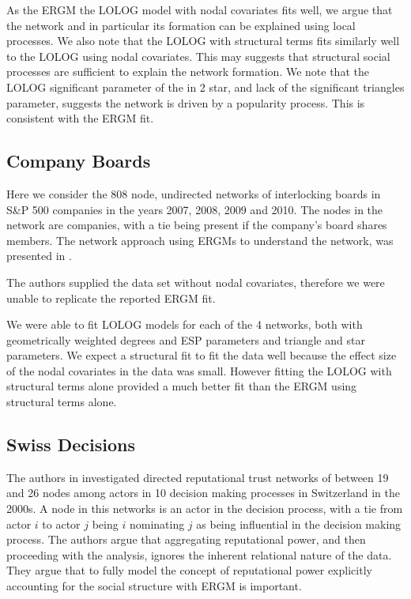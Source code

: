\documentclass[
]{statsoc}
\begin{document}
As the ERGM the LOLOG model with nodal covariates fits well, we argue
that the network and in particular its formation can be explained using
local processes. We also note that the LOLOG with structural terms fits
similarly well to the LOLOG using nodal covariates. This may suggests
that structural social processes are sufficient to explain the network
formation. We note that the LOLOG significant parameter of the in 2
star, and lack of the significant triangles parameter, suggests the
network is driven by a popularity process. This is consistent with the
ERGM fit.

\subsection{Company Boards}

Here we consider the 808 node, undirected networks of interlocking
boards in S\&P 500 companies in the years 2007, 2008, 2009 and 2010. The
nodes in the network are companies, with a tie being present if the
company's board shares members. The network approach using ERGMs to
understand the network, was presented in \cite{Gygax2015}.

The authors supplied the data set without nodal covariates, therefore we
were unable to replicate the reported ERGM fit.

We were able to fit LOLOG models for each of the 4 networks, both with
geometrically weighted degrees and ESP parameters and triangle and star
parameters. We expect a structural fit to fit the data well because the
effect size of the nodal covariates in the data was small. However
fitting the LOLOG with structural terms alone provided a much better fit
than the ERGM using structural terms alone.

\subsection{Swiss Decisions}

The authors in \cite{Fischer2015} investigated directed reputational
trust networks of between 19 and 26 nodes among actors in 10 decision
making processes in Switzerland in the 2000s. A node in this networks is
an actor in the decision process, with a tie from actor \(i\) to actor
\(j\) being \(i\) nominating \(j\) as being influential in the decision
making process. The authors argue that aggregating reputational power,
and then proceeding with the analysis, ignores the inherent relational
nature of the data. They argue that to fully model the concept of
reputational power explicitly accounting for the social structure with
ERGM is important.
\end{document}
